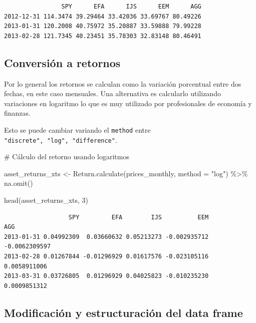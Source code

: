 \documentclass[
  letterpaper,
  DIV=11,
  numbers=noendperiod]{scrartcl}
\newenvironment{Shaded}{\begin{snugshade}}{\end{snugshade}}
\newcommand{\AttributeTok}[1]{\textcolor[rgb]{0.40,0.45,0.13}{#1}}
\newcommand{\CommentTok}[1]{\textcolor[rgb]{0.37,0.37,0.37}{#1}}
\newcommand{\DecValTok}[1]{\textcolor[rgb]{0.68,0.00,0.00}{#1}}
\newcommand{\FunctionTok}[1]{\textcolor[rgb]{0.28,0.35,0.67}{#1}}
\newcommand{\NormalTok}[1]{\textcolor[rgb]{0.00,0.23,0.31}{#1}}
\newcommand{\OtherTok}[1]{\textcolor[rgb]{0.00,0.23,0.31}{#1}}
\newcommand{\SpecialCharTok}[1]{\textcolor[rgb]{0.37,0.37,0.37}{#1}}
\newcommand{\StringTok}[1]{\textcolor[rgb]{0.13,0.47,0.30}{#1}}
\begin{document}
\begin{verbatim}
                SPY      EFA      IJS      EEM      AGG
2012-12-31 114.3474 39.29464 33.42036 33.69767 80.49226
2013-01-31 120.2008 40.75972 35.20887 33.59888 79.99228
2013-02-28 121.7345 40.23451 35.78303 32.83148 80.46491
\end{verbatim}

\subsection{Conversión a retornos}\label{conversiuxf3n-a-retornos}

Por lo general los retornos se calculan como la variación porcentual
entre dos fechas, en este caso mensuales. Una alternativa es calcularlo
utilizando variaciones en logaritmo lo que es muy utilizado por
profesionales de economía y finanzas.

Esto se puede cambiar variando el \texttt{method} entre
\texttt{"discrete",\ "log",\ "difference"}.

\begin{Shaded}
\begin{Highlighting}[]
\CommentTok{\# Cálculo del retorno usando logaritmos}

\NormalTok{asset\_returns\_xts }\OtherTok{\textless{}{-}}
  \FunctionTok{Return.calculate}\NormalTok{(prices\_monthly,}
                   \AttributeTok{method =} \StringTok{"log"}\NormalTok{) }\SpecialCharTok{\%\textgreater{}\%}
  \FunctionTok{na.omit}\NormalTok{()}

\FunctionTok{head}\NormalTok{(asset\_returns\_xts, }\DecValTok{3}\NormalTok{)}
\end{Highlighting}
\end{Shaded}

\begin{verbatim}
                  SPY         EFA        IJS          EEM           AGG
2013-01-31 0.04992309  0.03660632 0.05213273 -0.002935712 -0.0062309597
2013-02-28 0.01267844 -0.01296929 0.01617576 -0.023105116  0.0058911006
2013-03-31 0.03726805  0.01296929 0.04025823 -0.010235230  0.0009851312
\end{verbatim}

\subsection{Modificación y estructuración del data
frame}\label{modificaciuxf3n-y-estructuraciuxf3n-del-data-frame}
\end{document}
